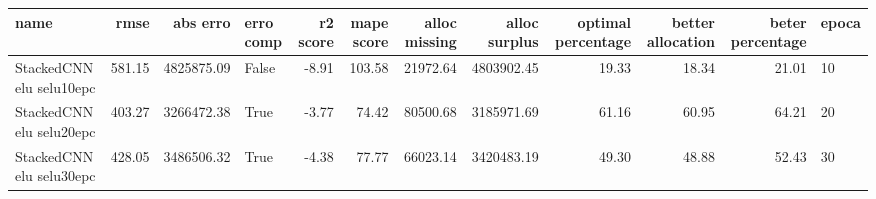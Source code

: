 \begin{tabular}{lrrlrrrrrrrl}
\toprule
name & rmse & abs erro & erro comp & r2 score & mape score & alloc missing & alloc surplus & optimal percentage & better allocation & beter percentage & epoca \\
\midrule
StackedCNN elu selu10epc & 581.15 & 4825875.09 & False & -8.91 & 103.58 & 21972.64 & 4803902.45 & 19.33 & 18.34 & 21.01 & 10 \\
StackedCNN elu selu20epc & 403.27 & 3266472.38 & True & -3.77 & 74.42 & 80500.68 & 3185971.69 & 61.16 & 60.95 & 64.21 & 20 \\
StackedCNN elu selu30epc & 428.05 & 3486506.32 & True & -4.38 & 77.77 & 66023.14 & 3420483.19 & 49.30 & 48.88 & 52.43 & 30 \\
\bottomrule
\end{tabular}
